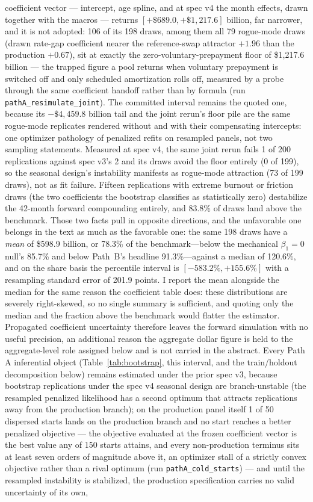 \documentclass[12pt]{article}
\begin{document}
coefficient vector --- intercept, age spline, and at spec v4 the month effects, drawn together with the macros --- returns $[+\$689.0, +\$1{,}217.6]$ billion, far narrower, and it is not adopted: 106 of its 198 draws, among them all 79 rogue-mode draws (drawn rate-gap coefficient nearer the reference-swap attractor $+1.96$ than the production $+0.67$), sit at exactly the zero-voluntary-prepayment floor of \$1{,}217.6 billion --- the trapped figure a pool returns when voluntary prepayment is switched off and only scheduled amortization rolls off, measured by a probe through the same coefficient handoff rather than by formula (run \texttt{pathA\_resimulate\_joint}). The committed interval remains the quoted one, because its $-\$4{,}459.8$ billion tail and the joint rerun's floor pile are the same rogue-mode replicates rendered without and with their compensating intercepts: one optimizer pathology of penalized refits on resampled panels, not two sampling statements. Measured at spec v4, the same joint rerun fails 1 of 200 replications against spec v3's 2 and its draws avoid the floor entirely (0 of 199), so the seasonal design's instability manifests as rogue-mode attraction (73 of 199 draws), not as fit failure. Fifteen replications with extreme burnout or friction draws (the two coefficients the bootstrap classifies as statistically zero) destabilize the 42-month forward compounding entirely, and 83.8\% of draws land above the benchmark. Those two facts pull in opposite directions, and the unfavorable one belongs in the text as much as the favorable one: the same 198 draws have a \emph{mean} of \$598.9 billion, or 78.3\% of the benchmark---below the mechanical $\beta_1 = 0$ null's 85.7\% and below Path~B's headline 91.3\%---against a median of 120.6\%, and on the share basis the percentile interval is $[-583.2\%, +155.6\%]$ with a resampling standard error of 201.9 points. I report the mean alongside the median for the same reason the coefficient table does: these distributions are severely right-skewed, so no single summary is sufficient, and quoting only the median and the fraction above the benchmark would flatter the estimator. Propagated coefficient uncertainty therefore leaves the forward simulation with no useful precision, an additional reason the aggregate dollar figure is held to the aggregate-level role assigned below and is not carried in the abstract. Every Path A inferential object (Table~\ref{tab:bootstrap}, this interval, and the train/holdout decomposition below) remains estimated under the prior spec v3, because bootstrap replications under the spec v4 seasonal design are branch-unstable (the resampled penalized likelihood has a second optimum that attracts replications away from the production branch); on the production panel itself 1 of 50 dispersed starts lands on the production branch and no start reaches a better penalized objective --- the objective evaluated at the frozen coefficient vector is the best value any of 150 starts attains, and every non-production terminus sits at least seven orders of magnitude above it, an optimizer stall of a strictly convex objective rather than a rival optimum (run \texttt{pathA\_cold\_starts}) --- and until the resampled instability is stabilized, the production specification carries no valid uncertainty of its own, 
\end{document}
